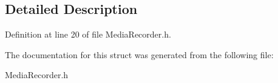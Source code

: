 \subsection{Detailed Description}


Definition at line 20 of file Media\-Recorder.\-h.



The documentation for this struct was generated from the following file\-:\begin{DoxyCompactItemize}
\item 
Media\-Recorder.\-h\end{DoxyCompactItemize}
